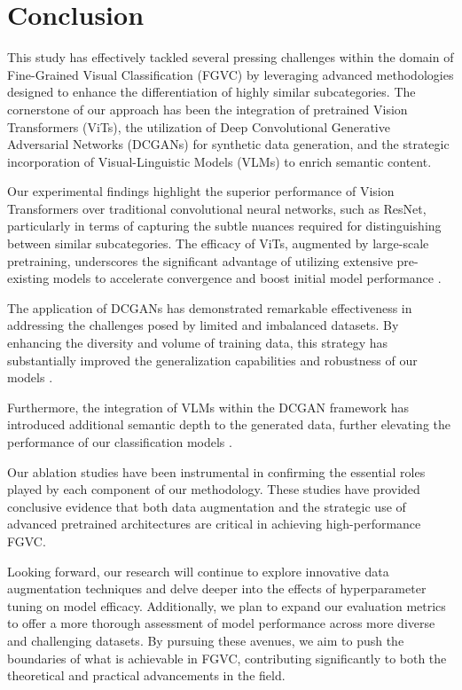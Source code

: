 \section{Conclusion}
\label{sec:conclusion}

This study has effectively tackled several pressing challenges within the domain of Fine-Grained Visual Classification (FGVC) by leveraging advanced methodologies designed to enhance the differentiation of highly similar subcategories. The cornerstone of our approach has been the integration of pretrained Vision Transformers (ViTs), the utilization of Deep Convolutional Generative Adversarial Networks (DCGANs) for synthetic data generation, and the strategic incorporation of Visual-Linguistic Models (VLMs) to enrich semantic content.

Our experimental findings highlight the superior performance of Vision Transformers over traditional convolutional neural networks, such as ResNet, particularly in terms of capturing the subtle nuances required for distinguishing between similar subcategories. The efficacy of ViTs, augmented by large-scale pretraining, underscores the significant advantage of utilizing extensive pre-existing models to accelerate convergence and boost initial model performance \cite{dosovitskiy2021an}.

The application of DCGANs has demonstrated remarkable effectiveness in addressing the challenges posed by limited and imbalanced datasets. By enhancing the diversity and volume of training data, this strategy has substantially improved the generalization capabilities and robustness of our models \cite{goodfellow2014generative}.

Furthermore, the integration of VLMs within the DCGAN framework has introduced additional semantic depth to the generated data, further elevating the performance of our classification models \cite{radford2021learning}.

Our ablation studies have been instrumental in confirming the essential roles played by each component of our methodology. These studies have provided conclusive evidence that both data augmentation and the strategic use of advanced pretrained architectures are critical in achieving high-performance FGVC.

Looking forward, our research will continue to explore innovative data augmentation techniques and delve deeper into the effects of hyperparameter tuning on model efficacy. Additionally, we plan to expand our evaluation metrics to offer a more thorough assessment of model performance across more diverse and challenging datasets. By pursuing these avenues, we aim to push the boundaries of what is achievable in FGVC, contributing significantly to both the theoretical and practical advancements in the field.
